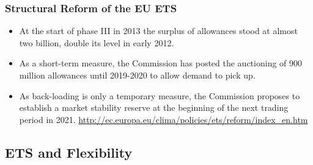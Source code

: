 \begin{frame}
  \frametitle{Structural Reform of the EU ETS}
 \begin{itemize}
  \item<1->  At the start of phase III in 2013 the surplus of allowances stood at almost two billion, double its level in early 2012.
  \item<2-> As a short-term measure, the Commission has posted the auctioning of 900 million allowances until 2019-2020 to allow demand to pick up. 
   \item<3-> 
   As back-loading is only a temporary measure, the Commission proposes to establish a market stability reserve at the beginning of the next trading period in 2021.
 \url{http://ec.europa.eu/clima/policies/ets/reform/index_en.htm}
   \end{itemize}
\end{frame} 

\subsection{ETS and Flexibility}



